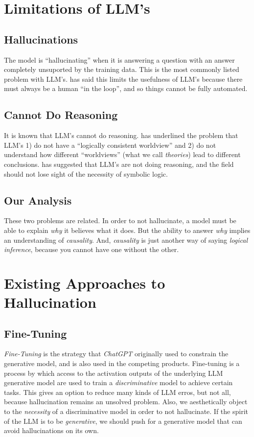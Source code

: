 \documentclass[12pt]{article}
\begin{document}
\section{Limitations of LLM's}
\subsection{Hallucinations}
The model is ``hallucinating'' when it is answering a question with an answer completely unsuported by the training data.
This is the most commonly listed problem with LLM's.
\cite{sutskever:huang:2023} has said this limits the usefulness of LLM's because there must always be a human ``in the loop'', and so things cannot be fully automated.
\subsection{Cannot Do Reasoning}
It is known that LLM's cannot do reasoning.
\cite{hinton:cbs:2023} has underlined the problem that LLM's 1) do not have a ``logically consistent worldview'' and 2) do not understand how different ``worldviews'' (what we call {\em theories}) lead to different conclusions.
\cite{steedman:2022} has suggested that LLM's are not doing reasoning, and the field should not lose sight of the necessity of symbolic logic.
\subsection{Our Analysis}
These two problems are related.
In order to not hallucinate, a model must be able to explain {\em why} it believes what it does.
But the ability to answer {\em why} implies an understanding of {\em causality}.
And, {\em causality} is just another way of saying {\em logical inference}, because you cannot have one without the other.
\section{Existing Approaches to Hallucination}
\subsection{Fine-Tuning}
{\em Fine-Tuning} is the strategy that {\em ChatGPT} originally used to constrain the generative model\cite{radford2018improving,radford2019language,brown2020language},
and is also used in the competing products.
Fine-tuning is a process by which access to the activation outputs of the underlying LLM generative model are used
to train a {\em discriminative} model to achieve certain tasks.
This gives an option to reduce many kinds of LLM erros, but not all, because hallucination remains an unsolved problem.
Also, we aesthetically object to the {\em necessity} of a discriminative model in order to not hallucinate.
If the spirit of the LLM is to be {\em generative}, we should push for a generative model that can avoid hallucinations on its own.
\end{document}
